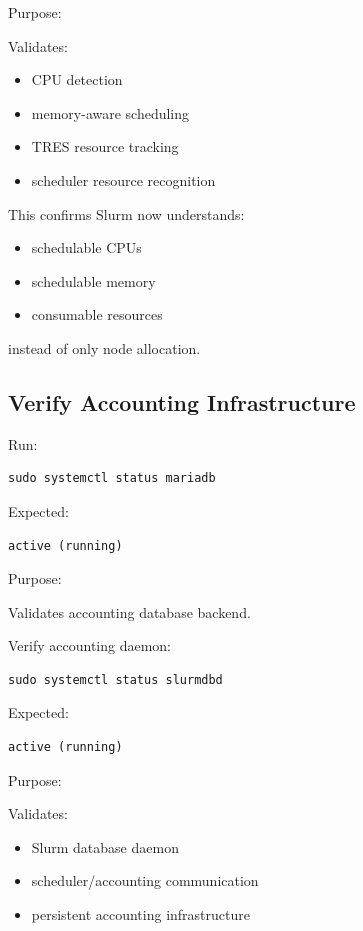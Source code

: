 \documentclass[11pt]{article}
\begin{document}
Purpose:

Validates:

\begin{itemize}
\item CPU detection
\item memory-aware scheduling
\item TRES resource tracking
\item scheduler resource recognition
\end{itemize}

This confirms Slurm now understands:

\begin{itemize}
\item schedulable CPUs
\item schedulable memory
\item consumable resources
\end{itemize}

instead of only node allocation.
\subsection{Verify Accounting Infrastructure}
\label{sec:org291ff87}

Run:

\begin{verbatim}
sudo systemctl status mariadb
\end{verbatim}

Expected:

\begin{verbatim}
active (running)
\end{verbatim}

Purpose:

Validates accounting database backend.

Verify accounting daemon:

\begin{verbatim}
sudo systemctl status slurmdbd
\end{verbatim}

Expected:

\begin{verbatim}
active (running)
\end{verbatim}

Purpose:

Validates:

\begin{itemize}
\item Slurm database daemon
\item scheduler/accounting communication
\item persistent accounting infrastructure
\end{itemize}
\end{document}
